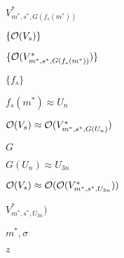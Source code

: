 \documentclass[10pt]{book}
\begin{document}
\begin{mdSnippets}
\begin{mdInlineSnippet}[aa3df35f6e62c92b53dbd0881f4a9967]%
$V_{m^*,s^*,G(f_s(m^*))}^*$\end{mdInlineSnippet}%
\begin{mdInlineSnippet}[0b627bc03ae8cf7fb97b58c7783c5bf4]%
$\{\mathcal{O}(V_s)\}$\end{mdInlineSnippet}%
\begin{mdInlineSnippet}[65b219310285222a25fba3f35f12c0b9]%
$\{\mathcal{O}(V_{m^*,s^*,G(f_s(m^*))}^*) \}$\end{mdInlineSnippet}%
\begin{mdInlineSnippet}[f0a0745b39ca7c74b201f7784e766521]%
$\{f_s\}$\end{mdInlineSnippet}%
\begin{mdInlineSnippet}[ffd9ac97cb31aa4546ca43202527476f]%
$f_s(m^*) \approx U_n$\end{mdInlineSnippet}%
\begin{mdInlineSnippet}%
$\mathcal{O}(V_s) \approx \mathcal{O}(V_{m^*,s^*,G(U_n)}^*)$\end{mdInlineSnippet}%
\begin{mdInlineSnippet}[dfcf28d0734569a6a693bc8194de62bf]%
$G$\end{mdInlineSnippet}%
\begin{mdInlineSnippet}%
$G(U_n) \approx U_{3n}$\end{mdInlineSnippet}%
\begin{mdInlineSnippet}[339a0e69bebf93148c9f14cd4e1f4d10]%
$\mathcal{O}(V_s) \approx \mathcal{O}(\mathcal{O}(V_{m^*,s^*,U_{3n}}^*))$\end{mdInlineSnippet}%
\begin{mdInlineSnippet}[c089af3f5c0e62a59638367bcc6c7f46]%
$V_{m^*,s^*,U_{3n}}^*)$\end{mdInlineSnippet}%
\begin{mdInlineSnippet}[09b6a16aed09a94ed90e93f50822a0a7]%
$m^*, \sigma$\end{mdInlineSnippet}%
\begin{mdInlineSnippet}[fbade9e36a3f36d3d676c1b808451dd7]%
$z$\end{mdInlineSnippet}%
\begin{mdInlineSnippet}[f8d51c444a9cbadc89a3f3827b015c2f]%

\end{mdInlineSnippet}
\end{mdSnippets}
\end{document}
